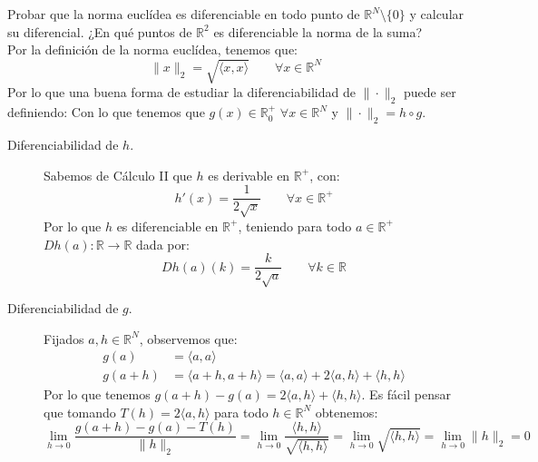 \begin{ejercicio}\label{ej:rel6_2}
Probar que la norma euclídea es diferenciable en todo punto de \( \mathbb{R}^N \setminus \{0\} \) y calcular su diferencial. ¿En qué puntos de \( \mathbb{R}^2 \) es diferenciable la norma de la suma?\\

\noindent
Por la definición de la norma euclídea, tenemos que:
\begin{equation*}
    \|x\|_2 = \sqrt{\langle x,x \rangle } \qquad \forall x\in \mathbb{R}^N
\end{equation*}
Por lo que una buena forma de estudiar la diferenciabilidad de $\|\cdot\|_2$ puede ser definiendo:
Con lo que tenemos que $g(x) \in \mathbb{R}^+_0$ $\forall x\in \mathbb{R}^N$ y $\|\cdot\|_2 = h\circ g$.
\begin{description}
    \item [Diferenciabilidad de $h$.] Sabemos de Cálculo II que $h$ es derivable en $\mathbb{R}^+$, con:
        \begin{equation*}
            h'(x) = \dfrac{1}{2\sqrt{x}} \qquad \forall x\in \mathbb{R}^+
        \end{equation*}
        Por lo que $h$ es diferenciable en $\mathbb{R}^+$, teniendo para todo $a\in \mathbb{R}^+$ $Dh(a):\mathbb{R}\to \mathbb{R}$ dada por:
        \begin{equation*}
            Dh(a)(k) = \dfrac{k}{2\sqrt{a}} \qquad \forall k\in \mathbb{R}
        \end{equation*}
    \item [Diferenciabilidad de $g$.] Fijados $a,h\in \mathbb{R}^N$, observemos que:
        \begin{align*}
            g(a) &= \langle a,a \rangle  \\
            g(a+h) &= \langle a+h,a+h \rangle  = \langle a,a \rangle  + 2\langle a,h \rangle + \langle h,h \rangle 
        \end{align*}
        Por lo que tenemos $g(a+h)-g(a) = 2\langle a,h \rangle +\langle h,h \rangle $. Es fácil pensar que tomando $T(h) = 2\langle a,h \rangle $ para todo $h\in \mathbb{R}^N$ obtenemos:
        \begin{equation*}
            \lim_{h\to0}\dfrac{g(a+h)-g(a)-T(h)}{\|h\|_2} = \lim_{h\to0}\dfrac{\langle h,h \rangle }{\sqrt{\langle h,h \rangle }} = \lim_{h\to0}\sqrt{\langle h,h \rangle } = \lim_{h\to0}\|h\|_2 = 0
        \end{equation*}

\end{description}
\end{ejercicio}
